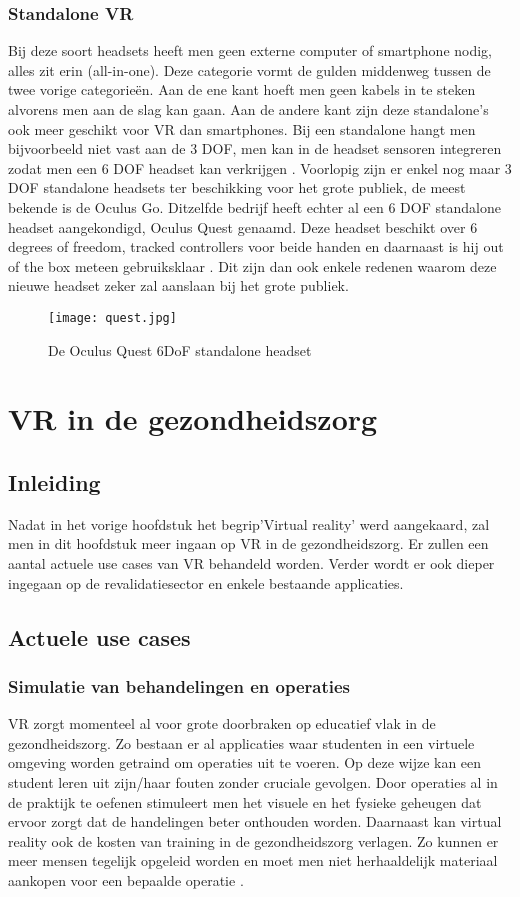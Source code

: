 \subsection{Standalone VR}
Bij deze soort headsets heeft men geen externe computer of smartphone nodig, alles zit erin (all-in-one). Deze categorie vormt de gulden middenweg tussen de twee vorige categorieën. Aan de ene kant hoeft men geen kabels in te steken alvorens men aan de slag kan gaan. Aan de andere kant zijn deze standalone's ook meer geschikt voor VR dan smartphones. Bij een standalone hangt men bijvoorbeeld niet vast aan de 3 DOF, men kan in de headset sensoren integreren zodat men een 6 DOF headset kan verkrijgen  \autocite{Cherdo2018}. Voorlopig zijn er enkel nog maar 3 DOF standalone headsets ter beschikking voor het grote publiek, de meest bekende is de Oculus Go. Ditzelfde bedrijf heeft echter al een 6 DOF standalone headset aangekondigd, Oculus Quest genaamd. Deze headset beschikt over 6 degrees of freedom, tracked controllers voor beide handen en daarnaast is hij out of the box meteen gebruiksklaar \autocite{Oculus2019}. Dit zijn dan ook enkele redenen waarom deze nieuwe headset zeker zal aanslaan bij het grote publiek.

\begin{figure}[h]
    \centering
    \texttt{[image: quest.jpg]}
    \caption{De Oculus Quest 6DoF standalone headset \autocite{Oculus2019}}
\end{figure}


\chapter{VR in de gezondheidszorg}
\section{Inleiding}
Nadat in het vorige hoofdstuk het begrip'Virtual reality' werd aangekaard, zal men in dit hoofdstuk meer ingaan op VR in de gezondheidszorg. Er zullen een aantal actuele use cases van VR behandeld worden. Verder wordt er ook dieper ingegaan op de revalidatiesector en enkele bestaande applicaties.

\section{Actuele use cases}
\subsection{Simulatie van behandelingen en operaties}
VR zorgt momenteel al voor grote doorbraken op educatief vlak in de gezondheidszorg. Zo bestaan er al applicaties waar studenten in een virtuele omgeving worden getraind om operaties uit te voeren. Op deze wijze kan een student leren uit zijn/haar fouten zonder cruciale gevolgen. Door operaties al in de praktijk te oefenen stimuleert men het visuele en het fysieke geheugen dat ervoor zorgt dat de handelingen beter onthouden worden. Daarnaast kan virtual reality ook de kosten van training in de gezondheidszorg verlagen. Zo kunnen er meer mensen tegelijk opgeleid worden en moet men niet herhaaldelijk materiaal aankopen voor een bepaalde operatie \autocite{Elion2018}.

